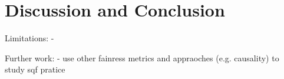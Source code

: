 \section*{Discussion and Conclusion}
Limitations:
- 

Further work:
- use other fainress metrics and appraoches (e.g. causality) to study sqf pratice
